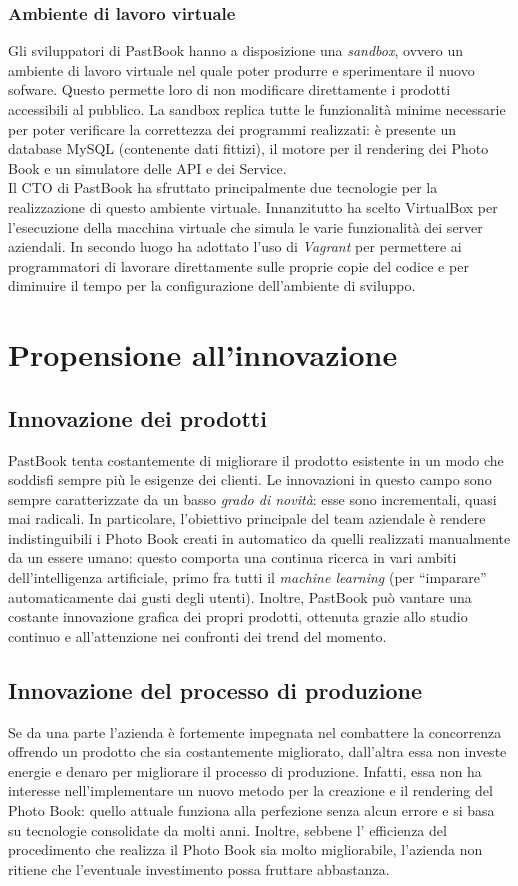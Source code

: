 			\subsubsection{Ambiente di lavoro virtuale}
				Gli sviluppatori di PastBook hanno a disposizione una \emph{sandbox}, ovvero un ambiente di lavoro virtuale nel
				quale poter produrre e sperimentare il nuovo sofware. Questo permette loro di non modificare direttamente i prodotti
				accessibili al pubblico. La sandbox replica tutte le funzionalità minime necessarie per poter verificare la
				correttezza dei programmi realizzati: è presente un database MySQL (contenente dati fittizi), il motore per il
				rendering dei Photo Book e un simulatore delle API e dei Service.\\
				Il CTO di PastBook ha sfruttato principalmente due tecnologie per la realizzazione di questo ambiente virtuale.
				Innanzitutto ha scelto VirtualBox per l'esecuzione della macchina virtuale che simula le varie funzionalità dei
				server aziendali. In secondo luogo ha adottato l'uso di \emph{Vagrant} per permettere ai programmatori di lavorare
				direttamente sulle proprie copie del codice e per diminuire il tempo per la configurazione dell'ambiente di
				sviluppo.
	\section{Propensione all'innovazione}
		\subsection{Innovazione dei prodotti}	
			PastBook tenta costantemente di migliorare il prodotto esistente in un modo che soddisfi sempre più le esigenze dei clienti.
			Le innovazioni in questo campo sono sempre caratterizzate da un basso \emph{grado di novità}: esse sono incrementali, quasi
			mai radicali. In particolare, l'obiettivo principale del team aziendale è rendere indistinguibili i Photo Book
			creati in automatico da quelli realizzati manualmente da un essere umano: questo comporta una continua ricerca in vari
			ambiti dell'intelligenza artificiale, primo fra tutti il \emph{machine learning} (per “imparare” automaticamente dai gusti
			degli utenti). Inoltre, PastBook può vantare una costante innovazione grafica dei propri prodotti, ottenuta grazie allo
			studio continuo e all'attenzione nei confronti dei trend del momento.
		\subsection{Innovazione del processo di produzione}
			Se da una parte l'azienda è fortemente impegnata nel combattere la concorrenza offrendo un prodotto che sia costantemente
			migliorato, dall'altra essa non investe energie e denaro per migliorare il processo di produzione. Infatti, essa non ha
			interesse nell'implementare un nuovo metodo per la creazione e il rendering del Photo Book: quello attuale funziona alla
			perfezione senza alcun errore e si basa su tecnologie consolidate da molti anni. Inoltre, sebbene l' efficienza del
			procedimento che realizza il Photo Book sia molto migliorabile, l'azienda non ritiene che l'eventuale investimento possa
			fruttare abbastanza.
